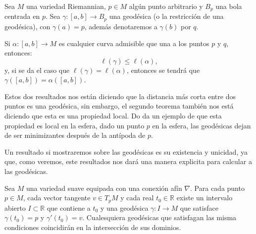 \begin{theorem}
  Sea $M$ una variedad Riemannian, $p \in M$ algún punto arbitrario y $B_{p}$ una bola centrada en $p$. Sea $\gamma: [a,b] \to B_{p}$ una geodésica (o la restricción de una geodésica), con $\gamma(a) = p$, además denotaremos a $\gamma(b)$ por $q$. 

  Si $\alpha: [a,b] \to M$ es cualquier curva admisible que una a los puntos $p$ y $q$, entonces:
  \[
    \ell(\gamma) \leq \ell(\alpha),
  \]
  y, si se da el caso que $\ell(\gamma) = \ell(\alpha)$, entonces se tendrá que $\gamma([a,b]) = \alpha([a,b])$.
\end{theorem}

Estos dos resultados nos están diciendo que la distancia más corta entre dos puntos es una geodésica, sin embargo, el segundo teorema también nos está diciendo que esta es una propiedad local. Do \textcite{do1992riemannian} da un ejemplo de que esta propiedad es local en la esfera, dado un punto $p$ en la esfera, las geodésicas dejan de ser minimizantes después de la antípoda de $p$.

Un resultado si mostraremos sobre las geodésicas es su existencia y unicidad, ya que, como veremos, este resultados nos dará una manera explicita para calcular a las geodésicas.

\begin{theorem} 
  Sea $M$ una variedad suave equipada con una conexión afín $\nabla$. Para cada punto $p \in M$, cada vector tangente $v \in T_{p}M$ y cada real $t_0 \in \mathbb{R}$ existe un intervalo abierto $I \subset \mathbb{R}$ que contiene a $t_0$ y una geodésica $\gamma: I \to M$ que satisface $\gamma(t_0) = p$ y $\gamma'(t_0) = v$. Cualesquiera geodésicas que satisfagan las misma condiciones coincidirán en la intersección de sus dominios.
\end{theorem}

